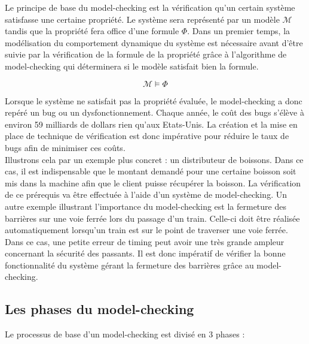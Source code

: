 \documentclass[runningheads,a4paper,10pt]{llncs}
\begin{document}
\noindent
Le principe de base du model-checking est la vérification qu'un certain système satisfasse une certaine propriété. Le système sera représenté par un modèle $\mathcal{M}$ tandis que la propriété fera office d'une formule $\Phi$. Dans un premier temps, la modélisation du comportement dynamique du système est nécessaire avant d'être suivie par la vérification de la formule de la propriété grâce à l'algorithme de model-checking qui déterminera si le modèle satisfait bien la formule.  

$$\boxed{\mathcal{M} \vDash \Phi}$$

\noindent
Lorsque le système ne satisfait pas la propriété évaluée, le model-checking a donc repéré un bug ou un dysfonctionnement. Chaque année, le coût des bugs s'élève à environ 59 milliards de dollars \cite{ErrorCost} rien qu'aux Etats-Unis. La création et la mise en place de technique de vérification est donc impérative pour réduire le taux de bugs afin de minimiser ces coûts.  \\

\noindent
Illustrons cela par un exemple plus concret : un distributeur de boissons. Dans ce cas, il est indispensable que le montant demandé pour une certaine boisson soit mis dans la machine afin que le client puisse récupérer la boisson. La vérification de ce prérequis va être effectuée à l'aide d'un système de model-checking. 
Un autre exemple illustrant l'importance du model-checking est la fermeture des barrières sur une voie ferrée lors du passage d'un train. 
Celle-ci doit être réalisée automatiquement lorsqu'un train est sur le point de traverser une voie ferrée. Dans ce cas, une petite erreur de timing peut avoir une très grande ampleur concernant la sécurité des passants. Il est donc impératif de vérifier la bonne fonctionnalité du système gérant la fermeture des barrières grâce au model-checking. 

\noindent 

\subsection{Les phases du model-checking}

Le processus de base d'un model-checking est divisé en 3 phases : 
\end{document}

